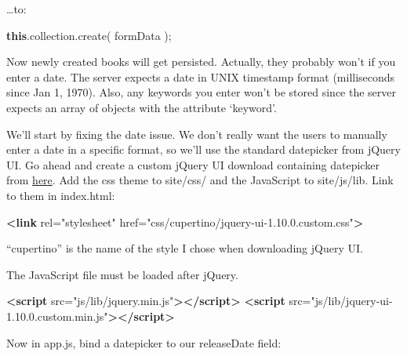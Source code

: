 \documentclass[9pt]{book}
\newenvironment{Shaded}{}{}
\newcommand{\KeywordTok}[1]{\textcolor[rgb]{0.00,0.44,0.13}{\textbf{{#1}}}}
\newcommand{\StringTok}[1]{\textcolor[rgb]{0.25,0.44,0.63}{{#1}}}
\newcommand{\OtherTok}[1]{\textcolor[rgb]{0.00,0.44,0.13}{{#1}}}
\newcommand{\FunctionTok}[1]{\textcolor[rgb]{0.02,0.16,0.49}{{#1}}}
\newcommand{\NormalTok}[1]{{#1}}
\begin{document}
\ldots{}to:

\begin{Shaded}
\begin{Highlighting}[]
\KeywordTok{this}\NormalTok{.}\OtherTok{collection}\NormalTok{.}\FunctionTok{create}\NormalTok{( formData );}
\end{Highlighting}
\end{Shaded}

Now newly created books will get persisted. Actually, they probably
won't if you enter a date. The server expects a date in UNIX timestamp
format (milliseconds since Jan 1, 1970). Also, any keywords you enter
won't be stored since the server expects an array of objects with the
attribute `keyword'.

We'll start by fixing the date issue. We don't really want the users to
manually enter a date in a specific format, so we'll use the standard
datepicker from jQuery UI. Go ahead and create a custom jQuery UI
download containing datepicker from
\href{http://jqueryui.com/download/}{here}. Add the css theme to
site/css/ and the JavaScript to site/js/lib. Link to them in index.html:

\begin{Shaded}
\begin{Highlighting}[]
\KeywordTok{<link}\OtherTok{ rel=}\StringTok{"stylesheet"}\OtherTok{ href=}\StringTok{"css/cupertino/jquery-ui-1.10.0.custom.css"}\KeywordTok{>}
\end{Highlighting}
\end{Shaded}

``cupertino'' is the name of the style I chose when downloading jQuery
UI.

The JavaScript file must be loaded after jQuery.

\begin{Shaded}
\begin{Highlighting}[]
\KeywordTok{<script}\OtherTok{ src=}\StringTok{"js/lib/jquery.min.js"}\KeywordTok{></script>}
\KeywordTok{<script}\OtherTok{ src=}\StringTok{"js/lib/jquery-ui-1.10.0.custom.min.js"}\KeywordTok{></script>}
\end{Highlighting}
\end{Shaded}

Now in app.js, bind a datepicker to our releaseDate field:

\begin{Shaded}
\end{Shaded}
\end{document}
